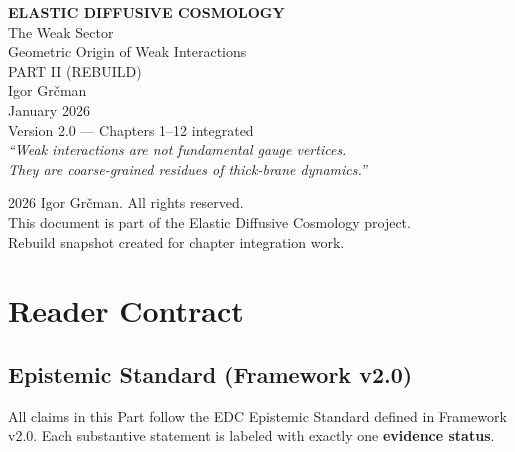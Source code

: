 \documentclass[11pt,a4paper]{book}
\theoremstyle{definition}
\theoremstyle{remark}
\begin{document}
\frontmatter

\begin{titlepage}
\centering
\vspace*{2cm}
{\Huge\bfseries ELASTIC DIFFUSIVE COSMOLOGY}\\[1.5cm]
{\Large The Weak Sector}\\[0.3cm]
{\Large Geometric Origin of Weak Interactions}\\[2cm]
{\large PART II (REBUILD)}\\[2cm]
{\Large Igor Gr\v{c}man}\\[1cm]
{\large January 2026}\\[0.5cm]
{\small Version 2.0 --- Chapters 1--12 integrated}\\[2cm]
\vfill
{\large\itshape ``Weak interactions are not fundamental gauge vertices.\\
They are coarse-grained residues of thick-brane dynamics.''}
\end{titlepage}

\newpage
\thispagestyle{empty}
\vspace*{\fill}
\begin{center}
\textcopyright{} 2026 Igor Gr\v{c}man. All rights reserved.\\[0.5cm]
This document is part of the Elastic Diffusive Cosmology project.\\
Rebuild snapshot created for chapter integration work.
\end{center}
\vspace*{\fill}

\tableofcontents

\chapter*{Reader Contract}

\section*{Epistemic Standard (Framework v2.0)}

All claims in this Part follow the EDC Epistemic Standard defined in Framework v2.0.
Each substantive statement is labeled with exactly one \textbf{evidence status}.
\end{document}
